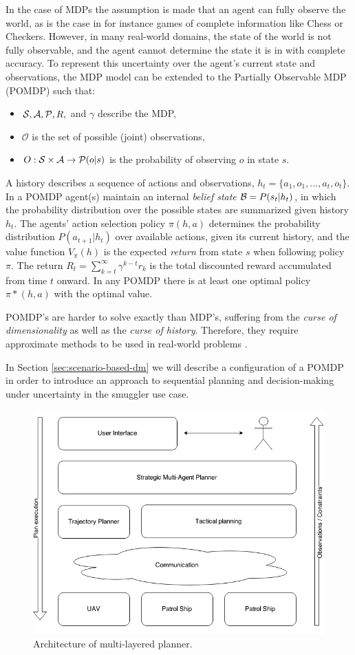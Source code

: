\documentclass[conference]{IEEEtran}
\begin{document}
In the case of MDPs the assumption is made that an agent can fully observe the world, as is the case in for instance games of complete information like Chess or Checkers. However, in many real-world domains, the state of the world is not fully observable, and the agent cannot determine the state it is in with complete accuracy. To represent this uncertainty over the agent's current state and observations, the MDP model can be extended to the Partially Observable MDP (POMDP) \cite{aastrom1965optimal,pomdp} such that: 

\begin{itemize}
\item $\S,\mathcal{A},\P,R,$ and $\gamma$ describe the MDP,
\item $\mathcal{O}$ is the set of possible (joint) observations,
\item $O:\S\times\mathcal{A}\to\P(o|s)$ is the probability of observing $o$ in state $s$. 
\end{itemize}

A history describes a sequence of actions and observations, $h_t = \{a_1, o_1, \ldots, a_t, o_t\}$. In a POMDP agent(s) maintain an internal {\it belief state} $\B = P(s_t | h_t)$, in which the probability distribution over the possible states are summarized given history $h_t$. The agents' action selection policy $\pi(h,a)$ determines the probability distribution $P(a_{t+1}|h_t)$ over available actions, given its current history, and the value function $V_{\pi}(h)$ is the expected {\it return} from state $s$ when following policy $\pi$. The return $R_t = \sum\nolimits_{k=t}^{\infty} \gamma^{k−t}r_k$ is the total discounted reward accumulated from time $t$ onward. In any POMDP there is at least one optimal policy $\pi*(h, a)$ with the optimal value.

POMDP's are harder to solve exactly than MDP's, suffering from the {\it curse of dimensionality} as well as the {\it curse of history}. Therefore, they require approximate methods to be used in real-world problems \cite{pineau2006anytime}.

In Section \ref{sec:scenario-based-dm} we will describe a configuration of a POMDP in order to introduce an approach to sequential planning and decision-making under uncertainty in the smuggler use case. 

\begin{figure}[t]
\begin{center}
 \includegraphics[width=.44\textwidth]{img/planning_archi.png}
 \caption{Architecture of multi-layered planner.}\label{fig:planning-archi}
\end{center}
\end{figure}
\end{document}
